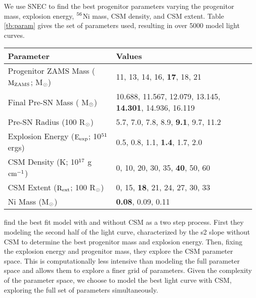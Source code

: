 \documentclass[a4paper,fleqn,usenatbib]{mnras}
\newcommand{\msunperiod}{M$\rm{_{\odot}}$}
\begin{document}
We use SNEC to find the best progenitor parameters varying the progenitor mass, explosion energy, $\rm{{}^{56}}$Ni mass, CSM density, and CSM extent. 
Table \ref{tb:param} gives the set of parameters used, resulting in over 5000 model light curves.
\begin{table*}
\centering
\caption{The grid of parameters used by SNEC. 
The values that best fit the data are in bold. The pre-explosion masses are taken from Table 2 of \citet{2016sukhbold}.}
\label{tb:param}
\begin{tabular}{l|l}
\hline
Parameter & Values \\
\hline
Progenitor ZAMS Mass ($\rm{M_{ZAMS}}$; \msunperiod) & 11, 13, 14, 16, {\bf17}, 18, 21 \\
Final Pre-SN Mass ( \msunperiod) & 10.688, 11.567, 12.079, 13.145, {\bf14.301}, 14.936, 16.119 \\
Pre-SN Radius (100 R$\rm{_{\odot}}$)                     & 5.7, 7.0, 7.8, 8.9, {\bf9.1}, 9.7, 11.2 \\
Explosion Energy ($\rm{E_{exp}}$; 10$\rm{^{51}}$ ergs)   & 0.5, 0.8, 1.1, {\bf 1.4}, 1.7, 2.0 \\
CSM Density (K; 10$\rm{^{17}}$ g $\rm{cm^{-1}}$)            & 0, 10, 20, 30, 35, {\bf40}, 50, 60 \\
CSM Extent ($\rm{R_{ext}}$; 100 R$\rm{_{\odot}}$)           & 0, 15, {\bf18}, 21, 24, 27, 30, 33 \\
Ni Mass (\msunperiod)                                                        & {\bf 0.08}, 0.09, 0.11 \\
\hline
\end{tabular}
\end{table*}
\citet{2018morozova} find the best fit model with and without CSM as a two step process. 
First they modeling the second half of the light curve, characterized by the s2 slope without CSM to determine the best progenitor mass and explosion energy. 
Then, fixing the explosion energy and progenitor mass, they explore the CSM parameter space. 
This is computationally less intensive than modeling the full parameter space and allows them to explore a finer grid of parameters.
Given the complexity of the parameter space, we choose to model the best light curve with CSM, exploring the full set of parameters simultaneously. 
\end{document}
